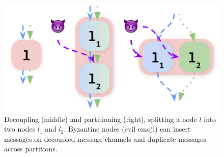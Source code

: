 

\begin{figure}[t]
    \centering
    \includegraphics[width=0.8\linewidth]{assets/rewrites.png}
    \caption{Decoupling (middle) and partitioning (right), splitting a node $l$ into two nodes $l_1$ and $l_2$. Byzantine nodes (evil emoji) can insert messages on decoupled message channels and duplicate messages across partitions.}
    \label{fig:rewrites}
\end{figure}


